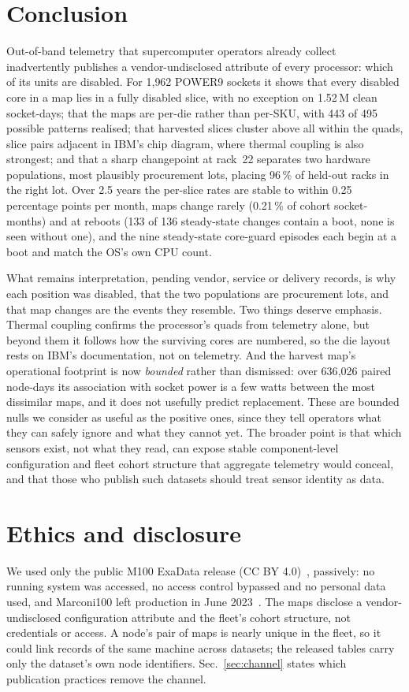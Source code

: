 \documentclass[10pt,conference]{IEEEtran}
\begin{document}
\section{Conclusion}
Out-of-band telemetry that supercomputer operators already collect inadvertently publishes a
vendor-undisclosed attribute of every processor: which of its units are disabled. For 1{,}962
POWER9 sockets it shows that every disabled core in a map lies in a fully disabled slice, with no
exception on 1.52\,M clean socket-days; that the maps are per-die rather than per-SKU, with 443 of
495 possible patterns realised; that harvested slices cluster above all within the quads, slice
pairs adjacent in IBM's chip diagram, where thermal coupling is also strongest; and that a sharp
changepoint at rack~22 separates two hardware populations, most plausibly procurement lots,
placing 96\,\% of held-out racks in the right lot. Over 2.5 years the per-slice rates are stable to
within 0.25 percentage points per month, maps change rarely (0.21\,\% of cohort socket-months) and
at reboots (133 of 136 steady-state changes contain a boot, none is seen without one), and the nine
steady-state core-guard episodes each begin at a boot and match the OS's own CPU count.

What remains interpretation, pending vendor, service or delivery records, is why each position was
disabled, that the two populations are procurement lots, and that map changes are the events they
resemble. Two things deserve emphasis. Thermal coupling confirms the processor's quads from
telemetry alone, but beyond them it follows how the surviving cores are numbered, so the die layout
rests on IBM's documentation, not on telemetry. And the harvest map's operational footprint is now
\emph{bounded} rather than dismissed: over 636{,}026 paired node-days its association with socket
power is a few watts between the most dissimilar maps, and it does not usefully predict
replacement. These are bounded nulls we consider as useful as the positive ones, since they tell
operators what they can safely ignore and what they cannot yet.
The broader point is that which sensors exist, not what they read, can expose stable
component-level configuration and fleet cohort structure that aggregate telemetry would conceal,
and that those who publish such datasets should treat sensor identity as data.

\section*{Ethics and disclosure}
We used only the public M100 ExaData release (CC BY 4.0)~\cite{borghesi2023m100,m100_zenodo},
passively: no running system was accessed, no access control bypassed and no personal data used,
and Marconi100 left production in June 2023~\cite{cineca_m100_eol}. The maps disclose a
vendor-undisclosed configuration attribute and the fleet's cohort structure, not credentials or
access. A node's pair of maps is nearly unique in the fleet, so it could link records of the same
machine across datasets; the released tables carry only the dataset's own node identifiers.
Sec.~\ref{sec:channel} states which publication practices remove the channel.
\end{document}
